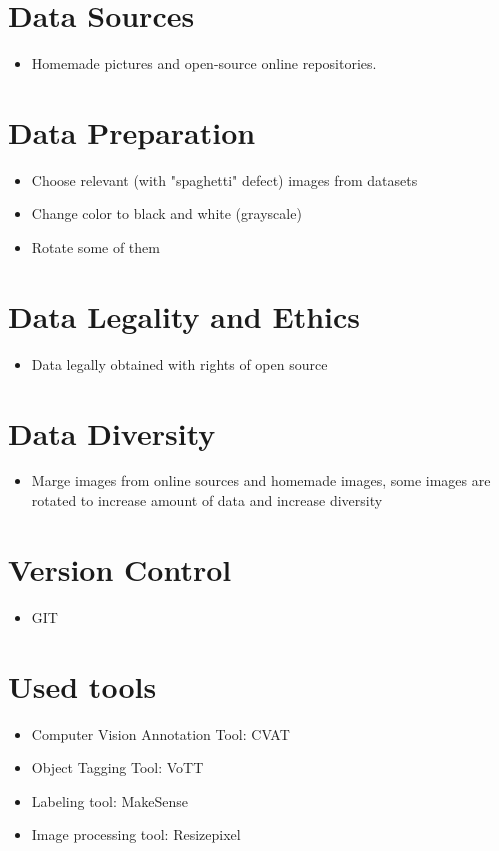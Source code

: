 \documentclass[12pt,a4paper]{article}
\begin{document}
\section{Data Sources}
\begin{itemize}
    \item Homemade pictures and open-source online repositories. {\scriptsize\cite{onlineOpenSource1}} {\scriptsize\cite{onlineOpenSource2}}
\end{itemize}

\section{Data Preparation}
\begin{itemize}
    \item Choose relevant (with "spaghetti" defect) images from datasets
    \item Change color to black and white (grayscale)
    \item Rotate some of them 
\end{itemize}

\section{Data Legality and Ethics}
\begin{itemize}
    \item Data legally obtained with rights of open source
\end{itemize}

\section{Data Diversity}
\begin{itemize}
    \item Marge images from online sources and homemade images, some images are rotated to increase amount of data and increase diversity
\end{itemize}

\section{Version Control}
\begin{itemize}
    \item GIT
\end{itemize}

\section{Used tools}
\begin{itemize}
    \item Computer Vision Annotation Tool: CVAT {\scriptsize\cite{labelingTool1}}
    \item Object Tagging Tool: VoTT {\scriptsize\cite{labelingTool2}}
    \item Labeling tool: MakeSense {\scriptsize\cite{labelingTool3}}
    \item Image processing tool: Resizepixel {\scriptsize\cite{imagesOnlineTool}} 
\end{itemize}
\end{document}
